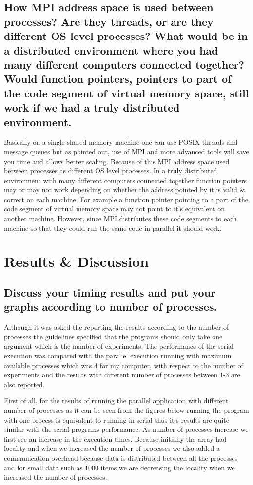 \documentclass[a4paper,11pt]{article}
\theoremstyle{mytheor}
\begin{document}
\subsection{How MPI address space is used between processes? Are they threads, or are they different OS level processes? What would be in a distributed environment where you had many different computers connected together? Would function pointers, pointers to part of the code segment of virtual memory space, still work if we had a truly distributed environment.}

Basically on a single shared memory machine one can use POSIX threads and message queues but as pointed out, use of MPI and more advanced tools will save you time and allows better scaling. Because of this MPI address space used between processes as different OS level processes. In a truly distributed environment with many different computers connected together function pointers may or may not work depending on whether the address pointed by it is valid \& correct on each machine. For example a function pointer pointing to a part of the code segment of virtual memory space may not point to it's equivalent on another machine. However, since MPI distributes these code segments to each machine so that they could run the same code in parallel it should work.

\section{Results \& Discussion}
\subsection{Discuss your timing results and put your graphs according to number of processes.}

Although it was asked the reporting the results according to the number of processes the guidelines specified that the programs should only take one argument which is the number of experiments. The performance of the serial execution was compared with the parallel execution running with maximum available processes which was 4 for my computer, with respect to the number of experiments and the results with different number of processes between 1-3 are also reported.

First of all, for the results of running the parallel application with different number of processes as it can be seen from the figures below running the program with one process is equivalent to running in serial thus it's results are quite similar with the serial programs performance. As number of processes increase we first see an increase in the execution times. Because initially the array had locality and when we increased the number of processes we also added a communication overhead because data is distributed between all the processes and for small data such as 1000 items we are decreasing the locality when we increased the number of processes.
\end{document}

